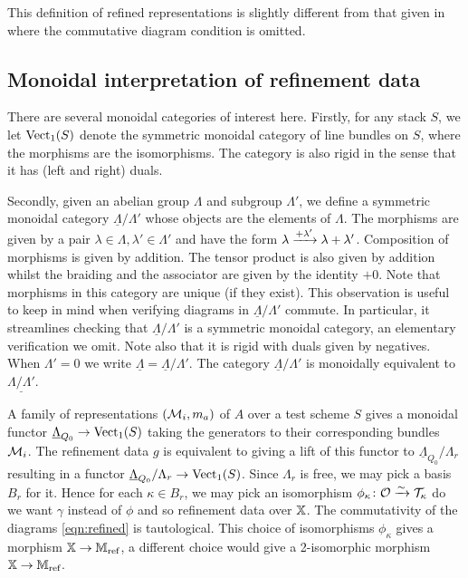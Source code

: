\documentclass[12pt]{amsart}
\begin{document}
\begin{remark}
This definition of refined representations is slightly different from that given in \cite[Definition 3.2]{Abd} where the commutative diagram condition is omitted.
\end{remark}

\subsection{Monoidal interpretation of refinement data}
There are several monoidal categories of interest here. 
Firstly, for any stack $S$, we let $\operatorname{Vect}_1 (S)$ denote the symmetric monoidal category of line bundles on $S$, where the morphisms are the isomorphisms. 
The category is also rigid in the sense that it has (left and right) duals. 

Secondly, given an abelian group $\Lambda$ and subgroup $\Lambda'$, we define a symmetric monoidal category $\underline{\Lambda}/\Lambda'$ whose objects are the elements of $\Lambda$.
The morphisms are given by a pair $\lambda \in \Lambda, \lambda' \in \Lambda'$ and have the form $\lambda \xrightarrow{+\lambda'} \lambda + \lambda'$. 
Composition of morphisms is given by addition. The tensor product is also given by addition whilst the braiding and the associator are given by the identity $+0$. Note that morphisms in this category are unique (if they exist). 
This observation is useful to keep in mind when verifying diagrams in $\underline{\Lambda}/\Lambda'$ commute. 
In particular, it streamlines checking that $\underline{\Lambda}/\Lambda'$ is a symmetric monoidal category, an elementary verification we omit. Note also that it is rigid with duals given by negatives.
When $\Lambda' = 0$ we write $\underline{\Lambda} = \underline{\Lambda}/\Lambda'$.
The category $\underline{\Lambda}/\Lambda'$ is monoidally equivalent to $\underline{\Lambda/\Lambda'}$.

A family of representations $(\mathcal{M}_i,  m_a)$ of $A$ over a test scheme $S$ gives a monoidal functor $\underline{\Lambda}_{Q_0} \rightarrow \operatorname{Vect}_1(S)$ taking the generators to their corresponding bundles $\mathcal{M}_i$.
The refinement data $g$ is equivalent to giving a lift of this functor to $\underline{\Lambda}_{Q_0}/\Lambda_r$ resulting in a functor $\underline{\Lambda}_{Q_0}/\Lambda_r \rightarrow \operatorname{Vect}_1(S)$.
Since $\Lambda_r$ is free, we may pick a basis $B_r$ for it. 
Hence for each $\kappa \in B_r$, we may pick an isomorphism $\phi_{\kappa} \colon \mathcal{O} \xrightarrow{\sim} \mathcal{T}_{\kappa}$ {\red do we want $\gamma$ instead of $\phi$} and so refinement data over $\mathbb{X}$.
The commutativity of the diagrams \ref{eqn:refined} is tautological.
This choice of isomorphisms $\phi_\kappa$ gives a morphism $\mathbb{X} \rightarrow \mathbb{M}_\text{ref}$, a different choice would give a 2-isomorphic morphism $\mathbb{X} \rightarrow \mathbb{M}_\text{ref}$.
\end{document}
